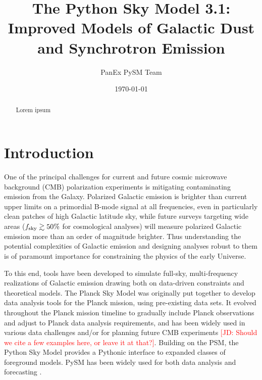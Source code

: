 \documentclass[twocolumn]{aastex631}
\begin{document}
\title{The Python Sky Model 3.1: \\Improved Models of Galactic Dust and Synchrotron Emission}
\author{PanEx PySM Team}
\date{\today}

\begin{abstract}
    Lorem ipsum
\end{abstract}

\section{Introduction}

One of the principal challenges for current and future cosmic microwave background (CMB) polarization experiments is mitigating contaminating emission from the Galaxy. Polarized Galactic emission is brighter than current upper limits on a primordial B-mode signal at all frequencies, even in particularly clean patches of high Galactic latitude sky, while future surveys targeting wide areas ($f_{\rm sky} \gtrsim 50\%$ for cosmological analyses) will measure polarized Galactic emission more than an order of magnitude brighter. Thus understanding the potential complexities of Galactic emission and designing analyses robust to them is of paramount importance for constraining the physics of the early Universe.

To this end, tools have been developed to simulate full-sky, multi-frequency realizations of Galactic emission drawing both on data-driven constraints and theoretical models. The Planck Sky Model \citep[PSM;][]{delabrouille2012} was originally put together to develop data analysis tools for the Planck mission, using pre-existing data sets. It evolved throughout the Planck mission timeline to gradually include Planck observations and adjust to Planck data analysis requirements, and has been widely used in various data challenges and/or for planning future CMB experiments \textcolor{red}{[JD: Should we cite a few examples here, or leave it at that?]}. Building on the PSM, the Python Sky Model \citep[PySM;][]{Thorne:2017} provides a Pythonic interface to expanded classes of foreground models. PySM has been widely used for both data analysis and forecasting \citep[e.g.,][]{CCAT-Primecollaboration:2021,Hensley:2021}. %
\end{document}
